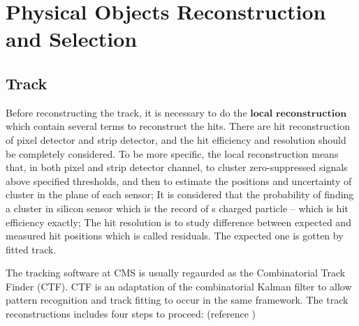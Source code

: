 

\section{Physical Objects Reconstruction and Selection}
\label{sec:PhysObj}


	\subsection{Track}
	\label{ssec:PhysObj_track}

		Before reconstructing the track, it is necessary to do the $\textbf{local}$ $\textbf{reconstruction}$ which contain several terms to reconstruct the hits. There are hit reconstruction of pixel detector and strip detector, and the hit efficiency and resolution should be completely considered. To be more specific, the local reconstruction means that, in both pixel and strip detector channel, to cluster zero-suppressed signals above specified thresholds, and then to estimate the positions and uncertainty of cluster in the plane of each sensor; It is considered that the probability of finding a cluster in silicon sensor which is the record of s charged particle -- which is hit efficiency exactly; The hit resolution is to study difference between expected and measured hit positions which is called residuals. The expected one is gotten by fitted track.

		The tracking software at CMS is usually regaurded as the Combinatorial Track Finder (CTF)\cite{Billoir1989ProgressiveTR}. CTF is an adaptation of the combinatorial Kalman filter\cite{Fruhwirth:1987fm} to allow pattern recognition and track fitting to occur in the same framework.
		The track reconstructions includes four steps to proceed: (reference \cite{Chatrchyan:2014fea})

